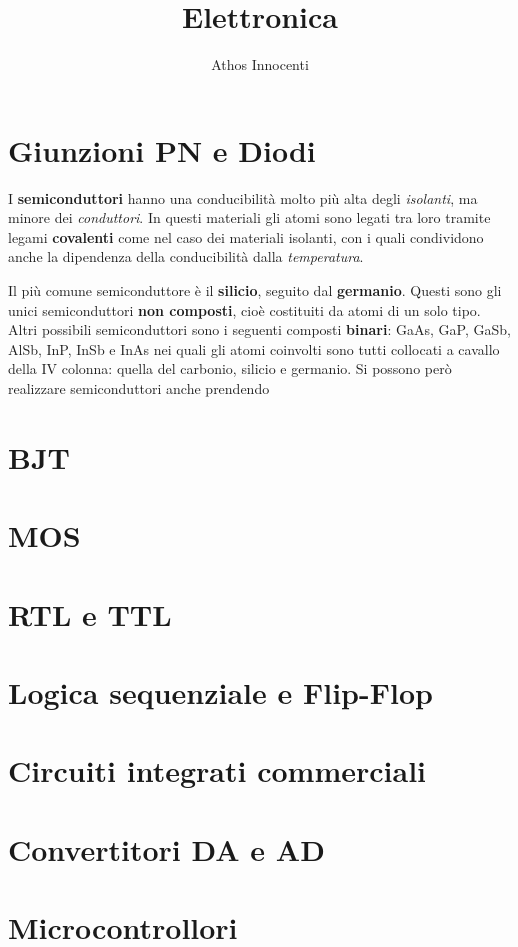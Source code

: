 \documentclass[12pt]{report}
\author{Athos Innocenti}
\title{\Huge Elettronica}\date{}\author{}
\begin{document}
\maketitle
\tableofcontents
\chapter{Giunzioni PN e Diodi}
I \textbf{semiconduttori} hanno una conducibilità molto più alta degli \textit{isolanti}, ma minore dei \textit{conduttori}. In questi materiali gli atomi sono legati tra loro tramite legami \textbf{covalenti} come nel caso dei materiali isolanti, con i quali condividono anche la dipendenza della conducibilità dalla \textit{temperatura}.

Il più comune semiconduttore è il \textbf{silicio}, seguito dal \textbf{germanio}. Questi sono gli unici semiconduttori \textbf{non composti}, cioè costituiti da atomi di un solo tipo. Altri possibili semiconduttori sono i seguenti composti \textbf{binari}: GaAs, GaP, GaSb, AlSb, InP, InSb e InAs nei quali gli atomi coinvolti sono tutti collocati a cavallo della IV colonna: quella del carbonio, silicio e germanio. Si possono però realizzare semiconduttori anche prendendo
\chapter{BJT}
\chapter{MOS}
\chapter{RTL e TTL}
\chapter{Logica sequenziale e Flip-Flop}
\chapter{Circuiti integrati commerciali}
\chapter{Convertitori DA e AD}
\chapter{Microcontrollori}
\end{document}
